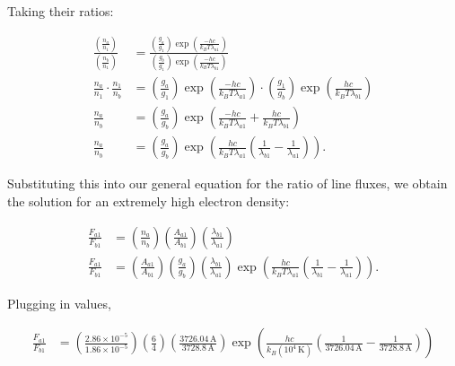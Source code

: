 \documentclass[12pt]{article}
\begin{document}
Taking their ratios:

\begin{equation*}
\begin{split}
\frac{\left(\frac{n_a}{n_1}\right)}{\left(\frac{n_b}{n_1}\right)} &= \frac{\left(\frac{g_a}{g_1}\right) \exp \left(\frac{-hc}{k_BT\lambda_{a1}}\right)}{\left(\frac{g_b}{g_1}\right) \exp \left(\frac{-hc}{k_BT\lambda_{b1}}\right)} \\
\frac{n_a}{n_1} \cdot \frac{n_1}{n_b} &= \left(\frac{g_a}{g_1}\right) \exp \left(\frac{-hc}{k_BT\lambda_{a1}}\right) \cdot \left(\frac{g_1}{g_b}\right) \exp \left(\frac{hc}{k_BT\lambda_{b1}}\right) \\
\frac{n_a}{n_b} &= \left(\frac{g_a}{g_b}\right) \exp \left(\frac{-hc}{k_BT\lambda_{a1}} + \frac{hc}{k_BT\lambda_{b1}} \right) \\
\frac{n_a}{n_b} &= \left(\frac{g_a}{g_b}\right) \exp \left(\frac{hc}{k_BT\lambda_{a1}} \left(\frac{1}{\lambda_{b1}} - \frac{1}{\lambda_{a1}}\right) \right).
\end{split}
\end{equation*}

Substituting this into our general equation for the ratio of line fluxes, we obtain the solution for an extremely high electron density:

\begin{equation*}
\begin{split}
\frac{F_{a1}}{F_{b1}} &= \left(\frac{n_a}{n_b}\right) \left(\frac{A_{a1}}{A_{b1}}\right) \left(\frac{\lambda_{b1}}{\lambda_{a1}}\right) \\
\frac{F_{a1}}{F_{b1}} &= \left(\frac{A_{a1}}{A_{b1}}\right) \left(\frac{g_a}{g_b}\right) \left(\frac{\lambda_{b1}}{\lambda_{a1}}\right) \exp \left(\frac{hc}{k_BT\lambda_{a1}} \left(\frac{1}{\lambda_{b1}} - \frac{1}{\lambda_{a1}}\right) \right). 
\end{split}
\end{equation*}

Plugging in values,

\begin{equation*}
\begin{split}
\frac{F_{a1}}{F_{b1}} &= \left(\frac{2.86\times10^{-5}}{1.86\times10^{-5}}\right) \left(\frac{6}{4}\right) \left(\frac{3726.04\,\mathrm{A}}{3728.8\,\mathrm{A}}\right) \exp \left(\frac{hc}{k_B(10^4\,\mathrm{K})} \left(\frac{1}{3726.04\,\mathrm{A}} - \frac{1}{3728.8\,\mathrm{A}}\right)\right)
\end{split}
\end{equation*}
\end{document}
